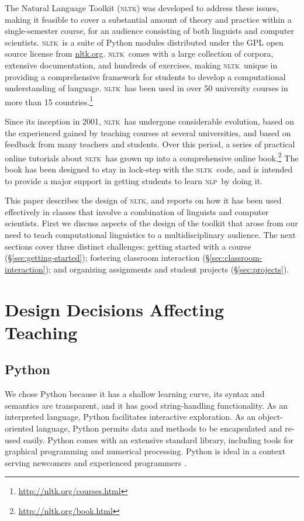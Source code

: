 \documentclass[11pt]{article}
\newcommand{\NLP}{\textsc{nlp}}
\newcommand{\NLTK}{\textsc{nltk}}
\begin{document}
The Natural Language Toolkit (\NLTK) was developed to address
these issues, making it feasible to cover a substantial amount of
theory and practice within a single-semester course, for an audience
consisting of both linguists and computer scientists.
\NLTK\ is a suite of Python modules
distributed under the GPL open source license from \url{nltk.org}.
\NLTK\ comes with a large collection of corpora, extensive
documentation, and hundreds of exercises, making
\NLTK\ unique in providing a comprehensive framework for
students to develop a computational understanding of language.
\NLTK\ has been used in over 50 university courses in more than 15
countries.\footnote{\url{http://nltk.org/courses.html}}

Since its inception in 2001, \NLTK\ has undergone considerable
evolution, based on the experienced gained by teaching courses at
several universities, and based on feedback from many teachers and
students.  Over this period, a series of practical online tutorials
about \NLTK\ has grown up into a comprehensive online book.\footnote{\url{http://nltk.org/book.html}}
The book has been designed to stay in lock-step
with the \NLTK\ code, and is intended to provide a major support in
getting students to learn \NLP\ by doing it.

This paper describes the design of \NLTK, and reports on how it has
been used effectively in classes that involve a combination of
linguists and computer scientists.  First we discuss aspects of the
design of the toolkit that arose from our need to teach computational
linguistics to a multidisciplinary audience.  The next sections
cover three distinct challenges:
getting started with a course (\S\ref{sec:getting-started});
fostering classroom interaction (\S\ref{sec:classroom-interaction});
and organizing assignments and student projects (\S\ref{sec:projects}).

\section{Design Decisions Affecting Teaching}
\label{sec:design}

\subsection{Python}

We chose Python because it has a shallow learning curve, its syntax
and semantics are transparent, and it has good string-handling
functionality.  As an interpreted language, Python facilitates
interactive exploration.  As an object-oriented language, Python
permits data and methods to be encapsulated and re-used easily.  Python comes with an extensive
standard library, including tools for graphical programming and
numerical processing.
Python is ideal in a context
serving newcomers and experienced programmers \cite{Shannon03}.
\end{document}
